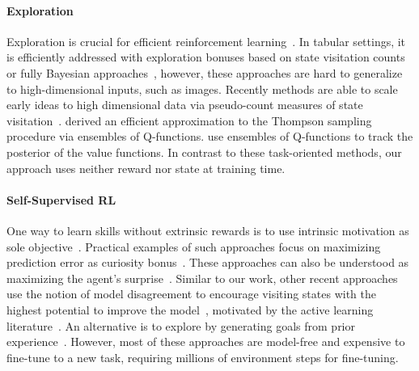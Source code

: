 \documentclass{article}
\begin{document}
\paragraph{Exploration}
Exploration is crucial for efficient reinforcement learning~\cite{kakade2002approximately}. In tabular settings, it is efficiently addressed with exploration bonuses based on state visitation counts~\cite{strehl08,jaksch2010near} or fully Bayesian approaches~\cite{duff2002optimal,poupart2006analytic}, however, these approaches are hard to generalize to high-dimensional inputs, such as images. Recently methods are able to scale early ideas to high dimensional data via pseudo-count measures of state visitation~\cite{bellemare2016unifying,ostrovski2017count}. \citet{osband2016deep} derived an efficient approximation to the Thompson sampling procedure via ensembles of Q-functions. \citet{osband2018randomized,lowrey2018plan} use ensembles of Q-functions to track the posterior of the value functions. In contrast to these task-oriented methods, our approach uses neither reward nor state at training time.

\vspace{-1ex}
\paragraph{Self-Supervised RL}
One way to learn skills without extrinsic rewards is to use intrinsic motivation as sole objective~\cite{oudeyer2009intrinsic}.
%
Practical examples of such approaches focus on maximizing prediction error as curiosity bonus~\cite{pathakICMl17curiosity,burda2018large,haber2018learning}. These approaches can also be understood as maximizing the agent's surprise~\cite{schmidhuber1991curious,josh_surprise}. Similar to our work, other recent approaches use the notion of model disagreement to encourage visiting states with the highest potential to improve the model~\cite{burda2018rnd,pathak2019self}, motivated by the active learning literature~\cite{Seung1992,mccallumzy1998employing}. An alternative is to explore by generating goals from prior experience~\cite{andrychowicz2017hindsight,nair2018imagined}. However, most of these approaches are model-free and expensive to fine-tune to a new task, requiring millions of environment steps for fine-tuning.

\vspace*{-1ex}
\end{document}
